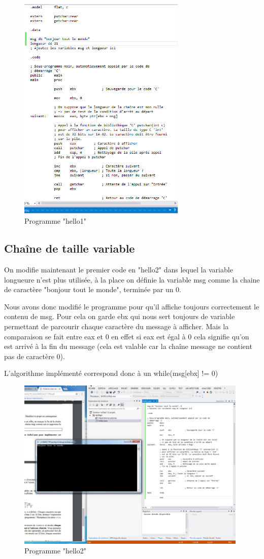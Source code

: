 \documentclass[11pt]{report}
\begin{document}
\begin{figure}[ht]
\includegraphics[width=8cm]{Capture5.PNG}
\caption{Programme "hello1"}
\end{figure}


\subsection{Chaîne de taille variable}

On modifie maintenant le premier code en "hello2" dans lequel la variable longueure n'est plus utilisée, à la place on définie la variable msg comme la chaine de caractère "bonjour tout le monde", terminée par un 0.

Nous avons donc modifié le programme pour qu'il affiche toujours correctement le contenu de msg. Pour cela on garde ebx qui nous sert toujours de variable permettant de parcourir chaque caractère du message à afficher. Mais la comparaison se fait entre eax et 0 en effet si eax est égal à 0 cela signifie qu'on est arrivé à la fin du message (cela est valable car la chaîne message ne contient pas de caractère 0).

L'algorithme implémenté correspond donc à un while(msg[ebx] != 0)



\begin{figure}[ht]
\includegraphics[width=11cm]{Capture4.PNG}
\caption{Programme "hello2"}
\end{figure}
\end{document}
